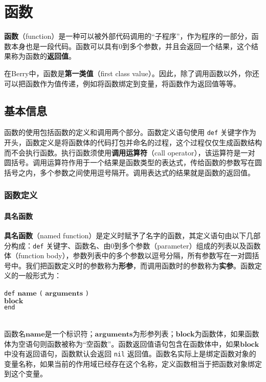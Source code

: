 \chapter{函数}

\textbf{函数}（function）是一种可以被外部代码调用的``子程序''，作为程序的一部分，函数本身也是一段代码。函数可以具有0到多个参数，并且会返回一个结果，这个结果称为函数的\textbf{返回值}。

在Berry中，函数是\textbf{第一类值}（first class value）。因此，除了调用函数以外，你还可以把函数作为值传递，例如将函数绑定到变量，将函数作为返回值等等。

\section{基本信息}

函数的使用包括函数的定义和调用两个部分。函数定义语句使用 \texttt{def} 关键字作为开头，函数定义是将函数体的代码打包并命名的过程，这个过程仅仅生成函数结构而不会执行函数。执行函数须使用\textbf{调用运算符}（call operator），该运算符是一对圆括号。调用运算符作用于一个结果是函数类型的表达式，传给函数的参数写在圆括号之内，多个参数之间使用逗号隔开。调用表达式的结果就是函数的返回值。

\subsection{函数定义}

\subsubsection{具名函数}

\textbf{具名函数}（named function）是定义时赋予了名字的函数，其定义语句由以下几部分构成：\texttt{def} 关键字、函数名、由0到多个参数（parameter）组成的列表以及函数体（function body），参数列表中的多个参数以逗号分隔，所有参数写在一对圆括号中。我们把函数定义时的参数称为\textbf{形参}，而调用函数时的参数称为\textbf{实参}。函数定义的一般形式为：
\begin{algorithm}
    \texttt{def} $\bm{name}$ \texttt{(} $\bm{arguments}$ \texttt{)} \\
        \qquad $\bm{block}$ \\
    \texttt{end}
\end{algorithm}\vspace{-0.6em}\\
函数名$\bm{name}$是一个标识符；$\bm{arguments}$为形参列表；$\bm{block}$为函数体，如果函数体为空语句则函数被称为``空函数''。函数返回值语句包含在函数体中，如果$\bm{block}$中没有返回语句，函数默认会返回 \texttt{nil} 返回值。函数名实际上是绑定函数对象的变量名称，如果当前的作用域已经存在这个名称，定义函数相当于把函数对象绑定到这个变量。

